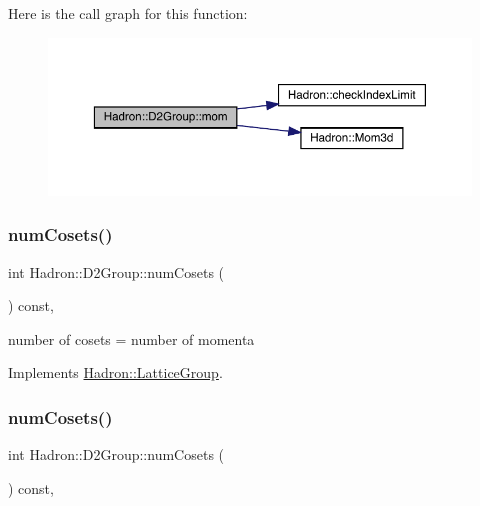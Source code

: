 Here is the call graph for this function\+:
\nopagebreak
\begin{figure}[H]
\begin{center}
\leavevmode
\includegraphics[width=350pt]{d8/de7/structHadron_1_1D2Group_a65d28ef1fef635e870d60b6606b65f19_cgraph}
\end{center}
\end{figure}
\mbox{\label{structHadron_1_1D2Group_a1f8a4f5adef5a9a05edd39f14d21f1cd}} 
\subsubsection{\texorpdfstring{numCosets()}{numCosets()}\hspace{0.1cm}{\footnotesize\ttfamily [1/3]}}
{\footnotesize\ttfamily int Hadron\+::\+D2\+Group\+::num\+Cosets (\begin{DoxyParamCaption}{ }\end{DoxyParamCaption}) const\hspace{0.3cm}{\ttfamily [inline]}, {\ttfamily [virtual]}}

number of cosets = number of momenta 

Implements \mbox{\hyperlink{structHadron_1_1LatticeGroup_afc76430f36a3a041f86d4058c59bf55e}{Hadron\+::\+Lattice\+Group}}.

\mbox{\label{structHadron_1_1D2Group_a1f8a4f5adef5a9a05edd39f14d21f1cd}} 
\subsubsection{\texorpdfstring{numCosets()}{numCosets()}\hspace{0.1cm}{\footnotesize\ttfamily [2/3]}}
{\footnotesize\ttfamily int Hadron\+::\+D2\+Group\+::num\+Cosets (\begin{DoxyParamCaption}{ }\end{DoxyParamCaption}) const\hspace{0.3cm}{\ttfamily [inline]}, {\ttfamily [virtual]}}

